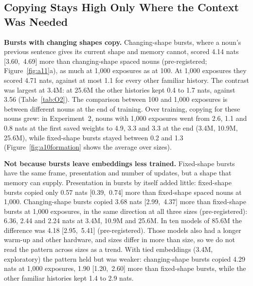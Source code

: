\documentclass{article}
\begin{document}
\subsection{Copying Stays High Only Where the Context Was Needed}\label{sec:bursts}
\textbf{Bursts with changing shapes copy.} Changing-shape bursts, where a noun's previous sentence gives its current shape and memory cannot, scored 4.14 nats [3.60,~4.69] more than changing-shape spaced nouns (pre-registered; Figure~\ref{fig:a11}a), as much at 1,000 exposures as at 100. At 1,000 exposures they scored 4.71 nats, against at most 1.1 for every other familiar history. The contrast was largest at 3.4M: at 25.6M the other histories kept 0.4 to 1.7 nats, against 3.56 (Table~\ref{tab:O2}). The comparison between 100 and 1,000 exposures is between different nouns at the end of training. Over training, copying for these nouns grew: in Experiment~2, nouns with 1,000 exposures went from 2.6, 1.1 and 0.8 nats at the first saved weights to 4.9, 3.3 and 3.3 at the end (3.4M, 10.9M, 25.6M), while fixed-shape bursts stayed between 0.2 and 1.3 (Figure~\ref{fig:a10formation} shows the average over sizes).

\begin{table}[!t]
\centering\small

\setlength{\tabcolsep}{3pt}

\caption{Experiment 3: copy score by corpus design, history and exposures (means over seeds by size, and seed-level mean with 95\% interval, sizes averaged). Mixed: ten seeds; single-history designs: five seeds. $^a$Over the three smaller sizes, as in the registered tests; 85.6M models were trained in the mixed design only.}
\label{tab:O2}
\end{table}

\textbf{Not because bursts leave embeddings less trained.} Fixed-shape bursts have the same frame, presentation and number of updates, but a shape that memory can supply. Presentation in bursts by itself added little: fixed-shape bursts copied only 0.57 nats [0.39,~0.74] more than fixed-shape spaced nouns at 1,000. Changing-shape bursts copied 3.68 nats [2.99,~4.37] more than fixed-shape bursts at 1,000 exposures, in the same direction at all three sizes (pre-registered): 6.36, 2.44 and 2.24 nats at 3.4M, 10.9M and 25.6M. In ten models of 85.6M the difference was 4.18 [2.95,~5.41] (pre-registered). Those models also had a longer warm-up and other hardware, and sizes differ in more than size, so we do not read the pattern across sizes as a trend. With tied embeddings (3.4M, exploratory) the pattern held but was weaker: changing-shape bursts copied 4.29 nats at 1,000 exposures, 1.90 [1.20,~2.60] more than fixed-shape bursts, while the other familiar histories kept 1.4 to 2.9 nats.
\end{document}
